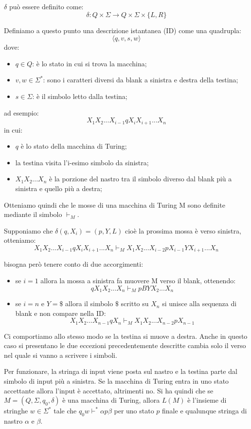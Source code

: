 $\delta$ può essere definito come:
$$
\delta : Q \times \Sigma \rightarrow Q \times \Sigma \times \{L,R\}
$$

Definiamo a questo punto una descrizione istantanea (ID) come una quadrupla:
$$
\langle q,v,s,w\rangle
$$
dove: 
\begin{itemize}
    \item $q \in Q$: è lo stato in cui si trova la macchina; 
    \item $v,w \in \Sigma^*$: sono i caratteri diversi da blank a sinistra e destra della testina; 
    \item $s \in \Sigma$: è il simbolo letto dalla testina;
\end{itemize}
ad esempio:
$$
X_1 X_2 ... X_{i-1} q X_i X_{i+1}...X_n
$$
in cui: 
\begin{itemize}
    \item $q$ è lo stato della macchina di Turing; 
    \item la testina visita l'i-esimo simbolo da sinistra; 
    \item $X_1X_2...X_n$ è la porzione del nastro tra il simbolo diverso dal blank più a sinistra e quello più a destra;
\end{itemize}

Otteniamo quindi che le mosse di una macchina di Turing M sono definite mediante il simbolo $\vdash_M$.

\emph{}

Supponiamo che $\delta(q,X_i)=(p,Y,L)$ cioè la prossima mossa è verso sinistra, otteniamo: 
$$
X_1X_2...X_{i-1}qX_iX_{i+1}...X_n \vdash_M X_1X_2...X_{i-2}pX_{i-1}YX_{i+1}...X_n
$$

bisogna però tenere conto di due accorgimenti: 
\begin{itemize}
    \item se $i=1$ allora la mossa a sinistra fa muovere M verso il blank, ottenendo: 
    $$
    qX_1X_2...X_n \vdash_M pBYX_2...X_n
    $$
    \item se $i=n$ e $Y=\$$ allora il simbolo $\$$ scritto su $X_n$ si unisce alla sequenza di blank e non compare nella ID: 
    $$
    X_1X_2...X_{n-1}qX_n \vdash_M X_1X_2...X_{n-2}pX_{n-1}
    $$
\end{itemize}

Ci comportiamo allo stesso modo se la testina si muove a destra. Anche in questo caso si presentano le due eccezioni precedentemente descritte cambia solo il verso nel quale si vanno a scrivere i simboli. 

Per funzionare, la stringa di input viene posta sul nastro e la testina parte dal simbolo di input più a sinistra.
Se la macchina di Turing entra in uno stato accettante allora l'input è accettato, altrimenti no.
Si ha quindi che se $M=(Q,\Sigma,q_0, \delta)$ è una macchina di Turing, allora $L(M)$ è l'insieme di stringhe $w \in \Sigma^*$ tale che $q_0w\vdash^*\alpha p\beta$ per uno stato $p$ finale e qualunque stringa di nastro $\alpha$ e $\beta$.

